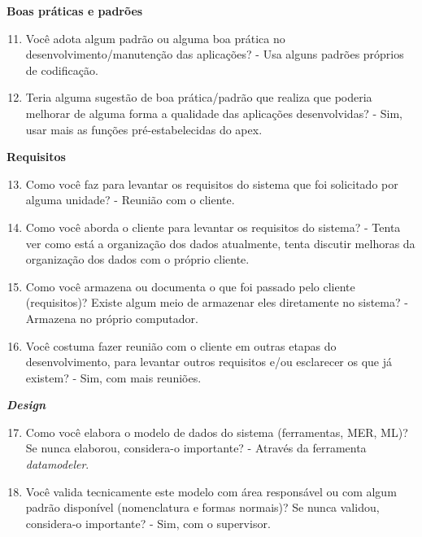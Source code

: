 \begin{apendicesenv}
\textbf{Boas práticas e padrões}

\begin{enumerate}
	\setcounter{enumi}{10}
	\item Você adota algum padrão ou alguma boa prática no desenvolvimento/manutenção das
	aplicações?\newline
	- Usa alguns padrões próprios de codificação.
	\item Teria alguma sugestão de boa prática/padrão que realiza que poderia melhorar de
	alguma forma a qualidade das aplicações desenvolvidas?\newline
	- Sim, usar mais as funções pré-estabelecidas do apex.
\end{enumerate}

\textbf{Requisitos}

\begin{enumerate}
	\setcounter{enumi}{12}
	\item Como você faz para levantar os requisitos do sistema que foi solicitado por alguma
	unidade?\newline
	- Reunião com o cliente.
	\item Como você aborda o cliente para levantar os requisitos do sistema?\newline
	- Tenta ver como está a organização dos dados atualmente, tenta discutir melhoras da organização dos dados com o próprio cliente.
	\item Como você armazena ou documenta o que foi passado pelo cliente (requisitos)? Existe
	algum meio de armazenar eles diretamente no sistema?\newline
	- Armazena no próprio computador.
	\item Você costuma fazer reunião com o cliente em outras etapas do desenvolvimento, para
	levantar outros requisitos e/ou esclarecer os que já existem?\newline
	- Sim, com mais reuniões.
\end{enumerate}

\textbf{\textit{Design}}

\begin{enumerate}
	\setcounter{enumi}{16}
	\item Como você elabora o modelo de dados do sistema (ferramentas, MER, ML)? Se nunca
	elaborou, considera-o importante?\newline
	- Através da ferramenta \textit{datamodeler}.
	\item Você valida tecnicamente este modelo com área responsável ou com algum padrão
	disponível (nomenclatura e formas normais)? Se nunca validou, considera-o importante?\newline
	- Sim, com o supervisor.
\end{enumerate}


\end{apendicesenv}
